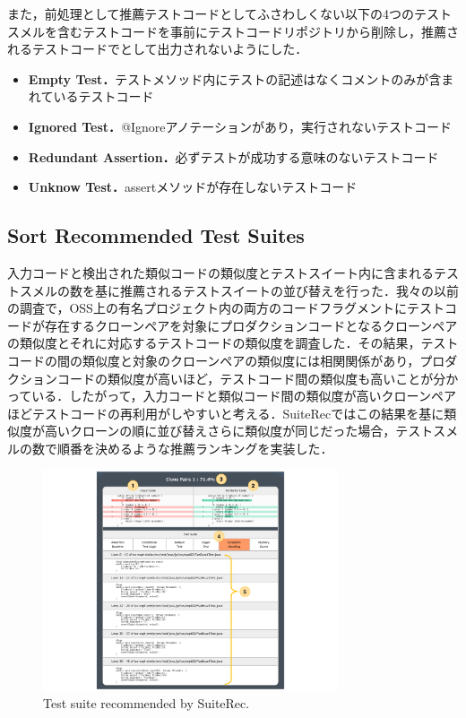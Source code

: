 \documentclass[conference]{IEEEtran}
\begin{document}
また，前処理として推薦テストコードとしてふさわしくない以下の4つのテストスメルを含むテストコードを事前にテストコードリポジトリから削除し，推薦されるテストコードでとして出力されないようにした．　

\begin{itemize}
\item \textbf{Empty Test．}テストメソッド内にテストの記述はなくコメントのみが含まれているテストコード
\item \textbf{Ignored Test．}@Ignoreアノテーションがあり，実行されないテストコード
\item \textbf{Redundant Assertion．}必ずテストが成功する意味のないテストコード
\item \textbf{Unknow Test．}assertメソッドが存在しないテストコード
\end{itemize}

\subsection{Sort Recommended Test Suites}
入力コードと検出された類似コードの類似度とテストスイート内に含まれるテストスメルの数を基に推薦されるテストスイートの並び替えを行った．我々の以前の調査で，OSS上の有名プロジェクト内の両方のコードフラグメントにテストコードが存在するクローンペアを対象にプロダクションコードとなるクローンペアの類似度とそれに対応するテストコードの類似度を調査した．その結果，テストコードの間の類似度と対象のクローンペアの類似度には相関関係があり，プロダクションコードの類似度が高いほど，テストコード間の類似度も高いことが分かっている．したがって，入力コードと類似コード間の類似度が高いクローンペアほどテストコードの再利用がしやすいと考える．SuiteRecではこの結果を基に類似度が高いクローンの順に並び替えさらに類似度が同じだった場合，テストスメルの数で順番を決めるような推薦ランキングを実装した．

\begin{figure}[htbp]
\centerline{\includegraphics[width=8.7cm]{SuiteRec.pdf}}
\caption{Test suite recommended by SuiteRec.}
\label{fig2}
\end{figure}
\end{document}
